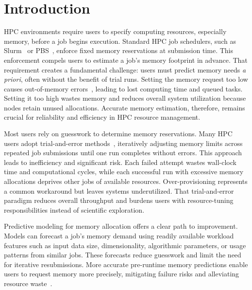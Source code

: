 \section{Introduction}
\label{sec:pmc-introduction}

\ac{HPC} environments require users to specify computing resources, especially memory, before a job begins execution.
Standard \ac{HPC} job schedulers, such as Slurm~\cite{yoo2003slurm} or \ac{PBS}~\cite{henderson1995pbs}, enforce fixed memory reservations at submission time.
This enforcement compels users to estimate a job's memory footprint in advance.
That requirement creates a fundamental challenge: users must predict memory needs \emph{a priori}, often without the benefit of trial runs.
Setting the memory request too low causes out-of-memory errors~\cite{bailey2005,hovestadt2003}, leading to lost computing time and queued tasks.
Setting it too high wastes memory and reduces overall system utilization because nodes retain unused allocations.
Accurate memory estimation, therefore, remains crucial for reliability and efficiency in \ac{HPC} resource management.

Most users rely on guesswork to determine memory reservations.
Many \ac{HPC} users adopt trial-and-error methods~\cite{rodrigues2016,li2019,newaz2023,tanash2021ampro}, iteratively adjusting memory limits across repeated job submissions until one run completes without errors.
This approach leads to inefficiency and significant risk.
Each failed attempt wastes wall-clock time and computational cycles, while each successful run with excessive memory allocations deprives other jobs of available resources.
Over-provisioning represents a common workaround but leaves systems underutilized.
That trial-and-error paradigm reduces overall throughput and burdens users with resource-tuning responsibilities instead of scientific exploration.

Predictive modeling for memory allocation offers a clear path to improvement.
Models can forecast a job's memory demand using readily available workload features such as input data size, dimensionality, algorithmic parameters, or usage patterns from similar jobs.
These forecasts reduce guesswork and limit the need for iterative resubmissions.
More accurate pre-runtime memory predictions enable users to request memory more precisely, mitigating failure risks and alleviating resource waste~\cite{tanash2021ampro}.


